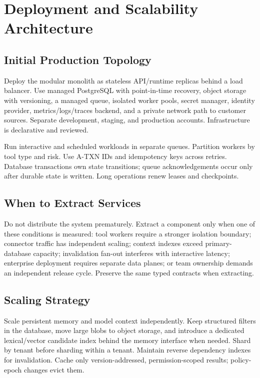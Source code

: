 \documentclass[10pt]{article}
\newcommand{\atxn}{\textsc{A-TXN}\xspace}
\begin{document}
\section{Deployment and Scalability Architecture}

\subsection{Initial Production Topology}

Deploy the modular monolith as stateless API/runtime replicas behind a load balancer. Use managed PostgreSQL with point-in-time recovery, object storage with versioning, a managed queue, isolated worker pools, secret manager, identity provider, metrics/logs/traces backend, and a private network path to customer sources. Separate development, staging, and production accounts. Infrastructure is declarative and reviewed.

Run interactive and scheduled workloads in separate queues. Partition workers by tool type and risk. Use \atxn IDs and idempotency keys across retries. Database transactions own state transitions; queue acknowledgements occur only after durable state is written. Long operations renew leases and checkpoints.

\subsection{When to Extract Services}

Do not distribute the system prematurely. Extract a component only when one of these conditions is measured: tool workers require a stronger isolation boundary; connector traffic has independent scaling; context indexes exceed primary-database capacity; invalidation fan-out interferes with interactive latency; enterprise deployment requires separate data planes; or team ownership demands an independent release cycle. Preserve the same typed contracts when extracting.

\subsection{Scaling Strategy}

Scale persistent memory and model context independently. Keep structured filters in the database, move large blobs to object storage, and introduce a dedicated lexical/vector candidate index behind the memory interface when needed. Shard by tenant before sharding within a tenant. Maintain reverse dependency indexes for invalidation. Cache only version-addressed, permission-scoped results; policy-epoch changes evict them.
\end{document}
